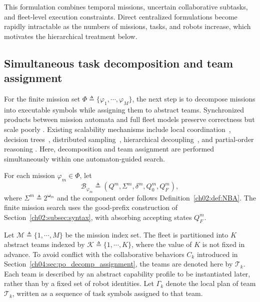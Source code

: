This formulation combines temporal missions, uncertain collaborative subtasks,
and fleet-level execution constraints. Direct centralized formulations become
rapidly intractable as the numbers of missions, tasks, and robots increase,
which motivates the hierarchical treatment below.
















\subsection{Simultaneous task decomposition and team assignment}
\label{ch04:subsubsec:simultaneous_assignment}

For the finite mission set
$\Phi \triangleq \{\varphi_1,\cdots,\varphi_M\}$, the next step is to decompose
missions into executable symbols while assigning them to abstract teams.
Synchronized products between mission automata and full fleet models preserve
correctness but scale poorly
\citep{schillinger2018simultaneous,luo2022temporal}. Existing scalability
mechanisms include local coordination~\citep{lindemann2019coupled}, decision
trees~\citep{chen2025realtime}, distributed sampling~\citep{kantaros2020stylus},
hierarchical decoupling~\citep{luo2025simultaneous}, and partial-order reasoning
\citep{liu2024time}. Here, decomposition and team assignment are performed
simultaneously within one automaton-guided search.
\begin{revision}
For each mission $\varphi_m \in \Phi$, let
\[
\mathcal{B}_{\varphi_m} \triangleq
(Q^m,\Sigma^m,\delta^m,Q_0^m,Q_F^m),
\]
where $\Sigma^m\triangleq 2^{\boldsymbol{\omega}_m}$ and the component order
follows Definition~\ref{ch02:def:NBA}. The finite mission search uses the
good-prefix construction of Section~\ref{ch02:subsec:syntax}, with absorbing
accepting states $Q_F^m$.
\end{revision}
Let
$\mathcal{M} \triangleq \{1,\cdots,M\}$ be the mission index set. The fleet is
partitioned into $K$ abstract teams indexed by
$\mathcal{K} \triangleq \{1,\cdots,K\}$, where the value of $K$ is not fixed in
advance. To avoid conflict with the collaborative behaviors $C_k$ introduced in
Section~\ref{ch04:sec:po_decomp_assignment}, the teams are denoted here by
$\mathcal{T}_k$. Each team is described by an abstract capability profile to be
instantiated later, rather than by a fixed set of robot identities. Let
$\Gamma_k$ denote the local plan of team $\mathcal{T}_k$, written as a sequence
of task symbols assigned to that team.

